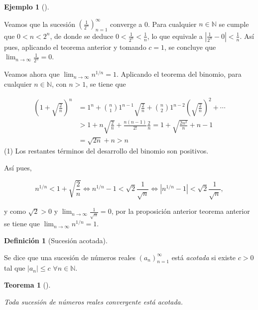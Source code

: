 \documentclass[
  a4paper,
]{scrreport}
\theoremstyle{definition}
\newtheorem{example}{Ejemplo}[chapter]
\theoremstyle{plain}
\theoremstyle{definition}
\newtheorem{definition}{Definición}[chapter]
\theoremstyle{definition}
\theoremstyle{plain}
\newtheorem{theorem}{Teorema}[chapter]
\theoremstyle{plain}
\theoremstyle{remark}
\begin{document}
\begin{example}[]\protect\hypertarget{exm-convergencia-sucesion-acotada}{}\label{exm-convergencia-sucesion-acotada}

Veamos que la sucesión \(\left(\frac{1}{2^n}\right)_{n=1}^\infty\)
converge a 0. Para cualquier \(n\in\mathbb{N}\) se cumple que
\(0<n<2^n\), de donde se deduce \(0<\frac{1}{2^n}<\frac{1}{n}\), lo que
equivale a \(|\frac{1}{2^n}-0|<\frac{1}{n}\). Así pues, aplicando el
teorema anterior y tomando \(c=1\), se concluye que
\(\lim_{n\to\infty}\frac{1}{2^n}=0\).

Veamos ahora que \(\lim_{n\to\infty}n^{1/n}=1\). Aplicando el teorema
del binomio, para cualquier \(n\in\mathbb{N}\), con \(n>1\), se tiene
que

\begin{align*}
(1+\sqrt{\frac{2}{n}})^n 
&= 1^n + \binom{n}{1}1^{n-1}\sqrt{\frac{2}{n}} + \binom{n}{2}1^{n-2}\left(\sqrt{\frac{2}{n}}\right)^2 + \cdots \tag{1} \\
& > 1 + n\sqrt{\frac{2}{n}} + \frac{n(n-1)}{2!}\frac{2}{n}
= 1 + \sqrt{\frac{2n^2}{n}} + n -1 \\
&= \sqrt{2n} + n
> n 
\end{align*} (1) Los restantes términos del desarrollo del binomio son
positivos.

Así pues,

\[
n^{1/n} < 1+\sqrt{\frac{2}{n}} 
\Leftrightarrow n^{1/n} - 1 < \sqrt{2}{\frac{1}{\sqrt{n}}} 
\Leftrightarrow |n^{1/n} - 1| < \sqrt{2}\frac{1}{\sqrt{n}},
\]

y como \(\sqrt{2}>0\) y \(\lim_{n\to\infty}\frac{1}{\sqrt{n}}=0\), por
la proposición anterior teorema anterior se tiene que
\(\lim_{n\to\infty} n^{1/n} = 1\).

\end{example}

\begin{definition}[Sucesión
acotada]\protect\hypertarget{def-sucesion-acotada}{}\label{def-sucesion-acotada}

Se dice que una sucesión de números reales \((a_n)_{n=1}^\infty\) está
\emph{acotada} si existe \(c>0\) tal que \(|a_n|\leq c\)
\(\forall n\in\mathbb{N}\).

\end{definition}

\begin{theorem}[]\protect\hypertarget{thm-convergencia-sucesion-acotada}{}\label{thm-convergencia-sucesion-acotada}

Toda sucesión de números reales convergente está acotada.

\end{theorem}
\end{document}
